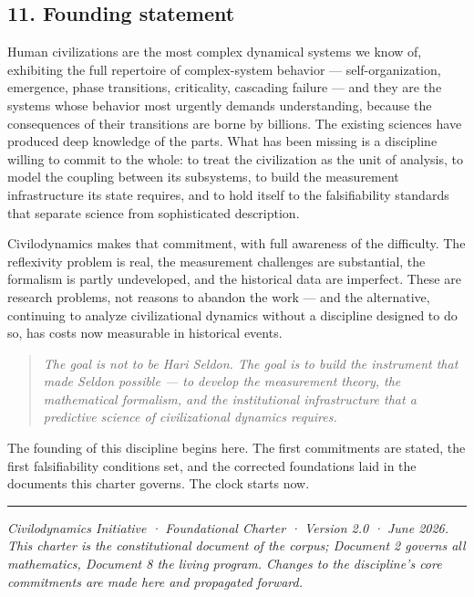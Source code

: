 \documentclass[
]{article}
\begin{document}
\subsection{11. Founding statement}\label{founding-statement}

Human civilizations are the most complex dynamical systems we know of,
exhibiting the full repertoire of complex-system behavior ---
self-organization, emergence, phase transitions, criticality, cascading
failure --- and they are the systems whose behavior most urgently
demands understanding, because the consequences of their transitions are
borne by billions. The existing sciences have produced deep knowledge of
the parts. What has been missing is a discipline willing to commit to
the whole: to treat the civilization as the unit of analysis, to model
the coupling between its subsystems, to build the measurement
infrastructure its state requires, and to hold itself to the
falsifiability standards that separate science from sophisticated
description.

Civilodynamics makes that commitment, with full awareness of the
difficulty. The reflexivity problem is real, the measurement challenges
are substantial, the formalism is partly undeveloped, and the historical
data are imperfect. These are research problems, not reasons to abandon
the work --- and the alternative, continuing to analyze civilizational
dynamics without a discipline designed to do so, has costs now
measurable in historical events.

\begin{quote}
\emph{The goal is not to be Hari Seldon. The goal is to build the
instrument that made Seldon possible --- to develop the measurement
theory, the mathematical formalism, and the institutional infrastructure
that a predictive science of civilizational dynamics requires.}
\end{quote}

The founding of this discipline begins here. The first commitments are
stated, the first falsifiability conditions set, and the corrected
foundations laid in the documents this charter governs. The clock starts
now.

\begin{center}\rule{0.5\linewidth}{0.5pt}\end{center}

\emph{Civilodynamics Initiative · Foundational Charter · Version 2.0 ·
June 2026. This charter is the constitutional document of the corpus;
Document 2 governs all mathematics, Document 8 the living program.
Changes to the discipline's core commitments are made here and
propagated forward.}
\end{document}
